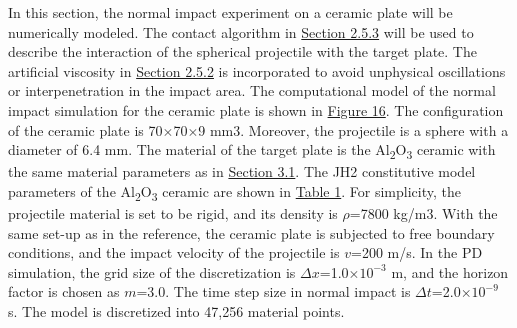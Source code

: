 \documentclass[11pt]{article}
\begin{document}
In this section, the normal impact experiment on a ceramic plate will be numerically modeled. The contact algorithm in \href{https://pmc.ncbi.nlm.nih.gov/articles/PMC10254440/?utm_source=chatgpt.com\#sec2dot5dot3-materials-16-04050}{Section 2.5.3} will be used to describe the interaction of the spherical projectile with the target plate. The artificial viscosity in \href{https://pmc.ncbi.nlm.nih.gov/articles/PMC10254440/?utm_source=chatgpt.com\#sec2dot5dot2-materials-16-04050}{Section 2.5.2} is incorporated to avoid unphysical oscillations or interpenetration in the impact area. The computational model of the normal impact simulation for the ceramic plate is shown in \href{https://pmc.ncbi.nlm.nih.gov/articles/PMC10254440/?utm_source=chatgpt.com\#materials-16-04050-f016}{Figure 16}. The configuration of the ceramic plate is 70\(\times\)70\(\times\)9 mm3. Moreover, the projectile is a sphere with a diameter of 6.4 mm. The material of the target plate is the Al\textsubscript{2}O\textsubscript{3} ceramic with the same material parameters as in \href{https://pmc.ncbi.nlm.nih.gov/articles/PMC10254440/?utm_source=chatgpt.com\#sec3dot1-materials-16-04050}{Section 3.1}. The JH2 constitutive model parameters of the Al\textsubscript{2}O\textsubscript{3} ceramic are shown in \href{https://pmc.ncbi.nlm.nih.gov/articles/PMC10254440/?utm_source=chatgpt.com\#materials-16-04050-t001}{Table 1}. For simplicity, the projectile material is set to be rigid, and its density is \(\rho\)=7800 kg/m3. With the same set-up as in the reference, the ceramic plate is subjected to free boundary conditions, and the impact velocity of the projectile is \(v\)=200 m/s. In the PD simulation, the grid size of the discretization is \(\Delta\)\(x\)=1.0\(\times\)\(10^{-3}\) m, and the horizon factor is chosen as \(m\)=3.0. The time step size in normal impact is \(\Delta\)\(t\)=2.0\(\times\)\(10^{-9}\) s. The model is discretized into 47,256 material points.
\end{document}
